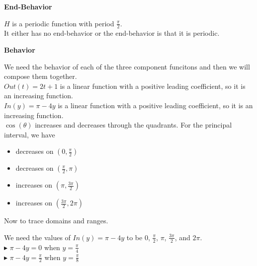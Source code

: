 \documentclass{ximera}
\begin{document}
\textbf{\textcolor{blue!55!black}{End-Behavior}}


$H$ is a periodic function with period $\frac{\pi}{2}$. \\

It either has no end-behavior or the end-behavior is that it is periodic.

















\textbf{\textcolor{blue!55!black}{Behavior}}


We need the behavior of each of the three component funcitons and then we will compose them together. \\




$Out(t) = 2t + 1$ is a linear function with a positive leading coefficient, so it is an increasing function.\\


$In(y) = \pi - 4y$ is a linear function with a positive leading coefficient, so it is an increasing function.\\


$\cos(\theta)$ increases and decreases through the quadrants. For the principal interval, we have


\begin{itemize}
  \item decreases on $\left( 0, \frac{\pi}{2} \right)$
  \item decreases on $\left( \frac{\pi}{2}, \pi \right)$
  \item increases on $\left( \pi, \frac{3\pi}{2} \right)$
  \item increases on $\left( \frac{3\pi}{2}, 2\pi \right)$
\end{itemize}


Now to trace domains and ranges.


We need the values of $In(y) = \pi - 4y$ to be $0$, $\frac{\pi}{2}$, $\pi$, $\frac{3\pi}{2}$, and $2\pi$. \\



$\blacktriangleright$ $\pi - 4y = 0$ when $y = \frac{\pi}{4}$ \\

$\blacktriangleright$ $\pi - 4y = \frac{\pi}{2}$ when $y = \frac{\pi}{8}$ \\
\end{document}
